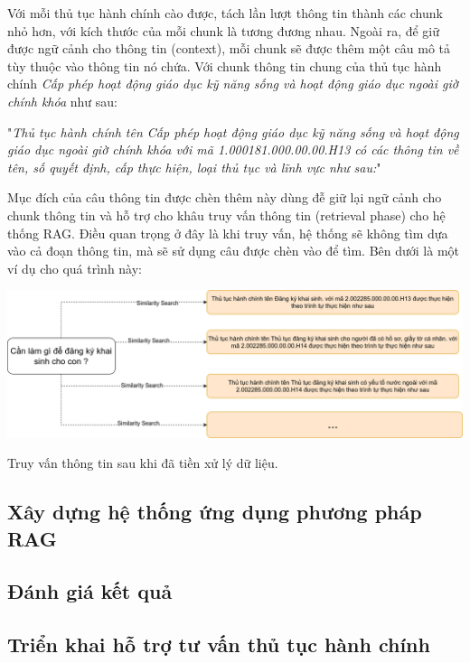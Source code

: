 \documentclass[a4paper, 12pt, openany]{book}
\begin{document}
Với mỗi thủ tục hành chính cào được, tách lần lượt thông tin thành các chunk nhỏ hơn, với kích thước của mỗi chunk 
là tương đương nhau. Ngoài ra, để giữ được ngữ cảnh cho thông tin (context), mỗi chunk sẽ được thêm một câu mô tả tùy thuộc vào thông tin nó chứa.
Với chunk thông tin chung của thủ tục hành chính \textit{Cấp phép hoạt động giáo dục kỹ năng sống và hoạt động giáo dục ngoài giờ chính khóa} như sau:

\vspace{0.5cm}
"\textit{Thủ tục hành chính tên Cấp phép hoạt động giáo dục kỹ năng sống và hoạt động giáo dục ngoài giờ chính khóa với mã 1.000181.000.00.00.H13 có các thông tin về  tên, số quyết định, cấp thực hiện, loại thủ tục và lĩnh vực như sau:}"

Mục đích của câu thông tin được chèn thêm này dùng đễ giữ lại ngữ cảnh cho chunk thông tin và hỗ trợ cho khâu truy vấn thông tin (retrieval phase) cho hệ thống RAG.
Điều quan trọng ở đây là khi truy vấn, hệ thống sẽ không tìm dựa vào cả đoạn thông tin, mà sẽ sử dụng câu
được chèn vào để tìm. Bên dưới là một ví dụ cho quá trình này:

\begin{minipage}{\linewidth}
    \centering
    \includegraphics[width=\linewidth]{./assets/images/search.drawio.png}
    \captionsetup{type=figure}
    \caption{Truy vấn thông tin sau khi đã tiền xử lý dữ liệu.}
\end{minipage}

\subsection{Xây dựng hệ thống ứng dụng phương pháp RAG}

\subsection{Đánh giá kết quả}

\subsection{Triển khai hỗ trợ tư vấn thủ tục hành chính}
\end{document}
